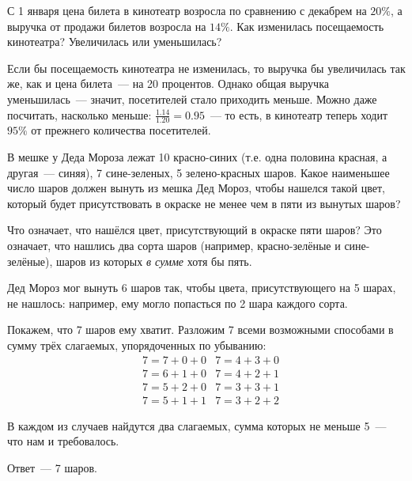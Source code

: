 \begin{itemize}
\itB С 1 января цена билета в кинотеатр возросла по сравнению с декабрем на $20 \%$, а выручка от продажи билетов возросла на $14 \%$. Как изменилась посещаемость кинотеатра? Увеличилась или уменьшилась?

\itr Если бы посещаемость кинотеатра не изменилась, то выручка бы увеличилась так же, как и цена билета~— на 20 процентов. Однако общая выручка уменьшилась~— значит, посетителей стало приходить меньше. Можно даже посчитать, насколько меньше: $\tfrac{1.14}{1.20} = 0.95$~— то есть, в кинотеатр теперь ходит $95 \%$ от прежнего количества посетителей.

\itC В мешке у Деда Мороза лежат 10 красно-синих (т.е. одна половина красная, а другая~— синяя), 7 сине-зеленых, 5 зелено-красных шаров. Какое наименьшее число шаров должен вынуть из мешка Дед Мороз, чтобы нашелся такой цвет, который будет присутствовать в окраске не менее чем в пяти из вынутых шаров?

\itr Что означает, что нашёлся цвет, присутствующий в окраске пяти шаров? Это означает, что нашлись два сорта шаров (например, красно-зелёные и сине-зелёные), шаров из которых {\itshape в сумме} хотя бы пять.

Дед Мороз мог вынуть 6 шаров так, чтобы цвета, присутствующего на 5 шарах, не нашлось: например, ему могло попасться по 2 шара каждого сорта.

Покажем, что 7 шаров ему хватит. Разложим 7 всеми возможными способами в сумму трёх слагаемых, упорядоченных по убыванию:
\begin{align*}
	& 7 = 7+0+0	& 7 = 4+3+0	\\
	& 7 = 6+1+0	& 7 = 4+2+1	\\
	& 7 = 5+2+0	& 7 = 3+3+1	\\
	& 7 = 5+1+1	& 7 = 3+2+2
\end{align*}

В каждом из случаев найдутся два слагаемых, сумма которых не меньше 5~— что нам и требовалось.

Ответ~— 7 шаров.
\bigbreak\noindent

\end{itemize}


